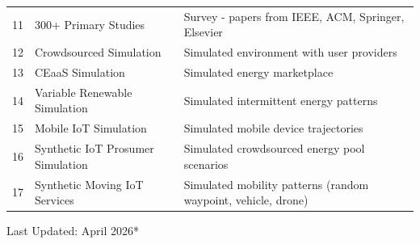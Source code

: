 \documentclass[12pt]{article}
\begin{document}
\begin{longtable}{|p{1cm}|p{3.5cm}|p{5cm}|}
	11             & 300+ Primary Studies              & Survey - papers from IEEE, ACM, Springer, Elsevier                                    \\
	12             & Crowdsourced Simulation           & Simulated environment with user providers                                             \\
	13             & CEaaS Simulation                  & Simulated energy marketplace                                                          \\
	14             & Variable Renewable Simulation     & Simulated intermittent energy patterns                                                \\
	15             & Mobile IoT Simulation             & Simulated mobile device trajectories                                                  \\
	16             & Synthetic IoT Prosumer Simulation & Simulated crowdsourced energy pool scenarios                                          \\
	17             & Synthetic Moving IoT Services     & Simulated mobility patterns (random waypoint, vehicle, drone)                         \\
\end{longtable}

\bigskip
\noindent *Last Updated: April 2026*
\end{document}
